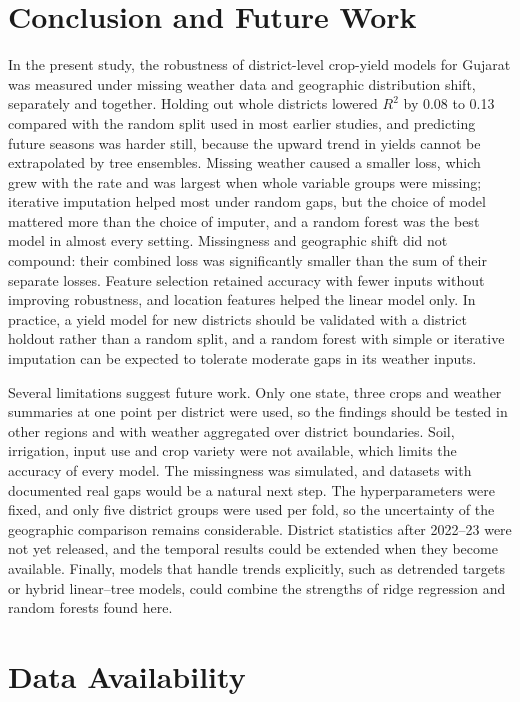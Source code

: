 \section{Conclusion and Future Work}\label{sec:concl}

In the present study, the robustness of district-level crop-yield models for Gujarat was measured
under missing weather data and geographic distribution shift, separately and together. Holding out
whole districts lowered $R^2$ by 0.08 to 0.13 compared with the random split used in most earlier
studies, and predicting future seasons was harder still, because the upward trend in yields cannot
be extrapolated by tree ensembles. Missing weather caused a smaller loss, which grew with the rate
and was largest when whole variable groups were missing; iterative imputation helped most under
random gaps, but the choice of model mattered more than the choice of imputer, and a random forest
was the best model in almost every setting. Missingness and geographic shift did not compound:
their combined loss was significantly smaller than the sum of their separate losses. Feature
selection retained accuracy with fewer inputs without improving robustness, and location features
helped the linear model only. In practice, a yield model for new districts should be validated with
a district holdout rather than a random split, and a random forest with simple or iterative
imputation can be expected to tolerate moderate gaps in its weather inputs.

Several limitations suggest future work. Only one state, three crops and weather summaries at one
point per district were used, so the findings should be tested in other regions and with weather
aggregated over district boundaries. Soil, irrigation, input use and crop variety were not
available, which limits the accuracy of every model. The missingness was simulated, and datasets
with documented real gaps would be a natural next step. The hyperparameters were fixed, and only
five district groups were used per fold, so the uncertainty of the geographic comparison remains
considerable. District statistics after 2022--23 were not yet released, and the temporal results
could be extended when they become available. Finally, models that handle trends explicitly, such
as detrended targets or hybrid linear--tree models, could combine the strengths of ridge regression
and random forests found here.

\section*{Data Availability}

